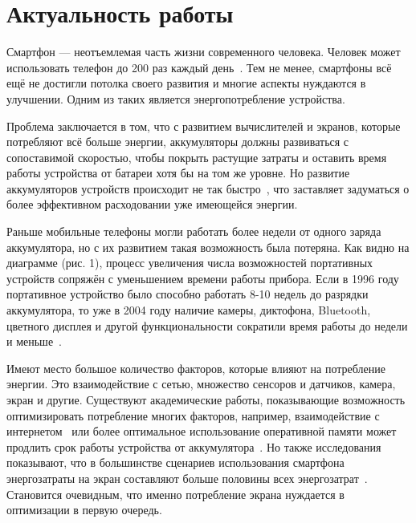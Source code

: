 \documentclass[a4paper,14pt]{extarticle} %
\begin{document}
	
	
	\newpage
	\tableofcontents
	\newpage
	
	
	
	\newpage
	\section{Актуальность работы}
	
	Смартфон --- неотъемлемая часть жизни современного человека. Человек может использовать телефон до 200 раз каждый день~\parencite{falaki2010diversity}. Тем не менее, смартфоны всё ещё не достигли потолка своего развития и многие аспекты нуждаются в улучшении. Одним из таких является энергопотребление устройства.
	
	Проблема заключается в том, что с развитием вычислителей и экранов, которые потребляют всё больше энергии, аккумуляторы должны развиваться с сопоставимой скоростью, чтобы покрыть растущие затраты и оставить время работы устройства от батареи хотя бы на том же уровне. Но развитие аккумуляторов устройств происходит не так быстро~\parencite{pentikousis2010search}, что заставляет задуматься о более эффективном расходовании уже имеющейся энергии.
	
	Раньше мобильные телефоны могли работать более недели от одного заряда аккумулятора, но с их развитием такая возможность была потеряна. Как видно на диаграмме (рис. 1), процесс увеличения числа возможностей портативных устройств сопряжён с уменьшением времени работы прибора. Если в 1996 году портативное устройство было способно работать 8-10 недель до разрядки аккумулятора, то уже в 2004 году наличие камеры, диктофона, Bluetooth, цветного дисплея и другой функциональности сократили время работы до недели и меньше~\parencite{василенко2005методы}.
	
	Имеют место большое количество факторов, которые влияют на потребление энергии. Это взаимодействие с сетью, множество сенсоров и датчиков, камера, экран и другие. Существуют академические работы, показывающие возможность оптимизировать потребление многих факторов, например, взаимодействие с интернетом~\parencite{tuysuz2019real} или более оптимальное использование оперативной памяти может продлить срок работы устройства от аккумулятора~\parencite{li2014investigation}. Но также исследования показывают, что в большинстве сценариев использования смартфона энергозатраты на экран составляют больше половины всех энергозатрат~\parencite{bai2013android}. Становится очевидным, что именно потребление экрана нуждается в оптимизации в первую очередь.
	
\end{document}
